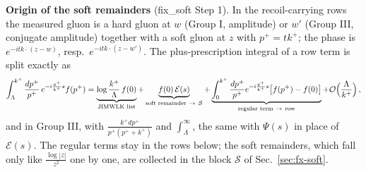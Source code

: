 {\noindent\textbf{Origin of the soft remainders} (fix\_soft Step 1). In the recoil-carrying rows the measured gluon is a hard gluon at $w$ (Group I, amplitude) or $w'$ (Group III, conjugate amplitude) together with a soft gluon at $z$ with $p^{+}=tk^{+}$; the phase is $e^{-itk\cdot(z-w)}$, resp.\ $e^{-itk\cdot(z-w')}$. The plus-prescription integral of a row term is split exactly as
\begin{align}
\int_{\Lambda}^{k^{+}}\frac{dp^{+}}{p^{+}}\,e^{-i\frac{p^{+}}{k^{+}}s}f(p^{+})=\underbrace{\log\frac{k^{+}}{\Lambda}\,f(0)}_{\text{JIMWLK list}}+\underbrace{f(0)\,\mathcal{E}(s)}_{\text{soft remainder}\ \to\ \mathcal{S}}+\underbrace{\int_{0}^{k^{+}}\frac{dp^{+}}{p^{+}}e^{-i\frac{p^{+}}{k^{+}}s}\big[f(p^{+})-f(0)\big]}_{\text{regular term}\ \to\ \text{row}}+{\cal O}\Big(\frac{\Lambda}{k^{+}}\Big)\,,\label{eq:fx-split}
\end{align}
and in Group III, with $\frac{k^{+}dp^{+}}{p^{+}(p^{+}+k^{+})}$ and $\int_{\Lambda}^{\infty}$, the same with $\Psi(s)$ in place of $\mathcal{E}(s)$. The regular terms stay in the rows below; the soft remainders, which fall only like $\frac{\log|z|}{z^{2}}$ one by one, are collected in the block $\mathcal{S}$ of Sec.~\ref{sec:fx-soft}.}\par
